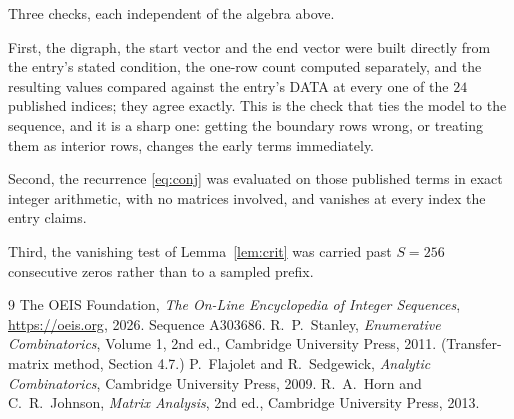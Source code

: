 \documentclass[11pt,a4paper]{article}
\theoremstyle{plain}
\theoremstyle{definition}
\begin{document}
Three checks, each independent of the algebra above.

First, the digraph, the start vector and the end vector were built directly from the
entry's stated condition, the one-row count computed separately, and the resulting values
compared against the entry's DATA at every one of the $24$ published indices; they
agree exactly. This is the check that ties the model to the sequence, and it is a sharp one:
getting the boundary rows wrong, or treating them as interior rows, changes the early terms
immediately.

Second, the recurrence \eqref{eq:conj} was evaluated on those published terms in exact
integer arithmetic, with no matrices involved, and vanishes at every index the entry claims.

Third, the vanishing test of Lemma~\ref{lem:crit} was carried past $S=256$ consecutive
zeros rather than to a sampled prefix.

\begin{thebibliography}{9}
 The OEIS Foundation, \emph{The On-Line Encyclopedia of Integer
Sequences}, \url{https://oeis.org}, 2026. Sequence A303686.
 R.~P.~Stanley, \emph{Enumerative Combinatorics}, Volume 1, 2nd ed.,
Cambridge University Press, 2011. (Transfer-matrix method, Section 4.7.)
 P.~Flajolet and R.~Sedgewick, \emph{Analytic Combinatorics}, Cambridge
University Press, 2009.
 R.~A.~Horn and C.~R.~Johnson, \emph{Matrix Analysis}, 2nd ed., Cambridge
University Press, 2013.
\end{thebibliography}
\end{document}
